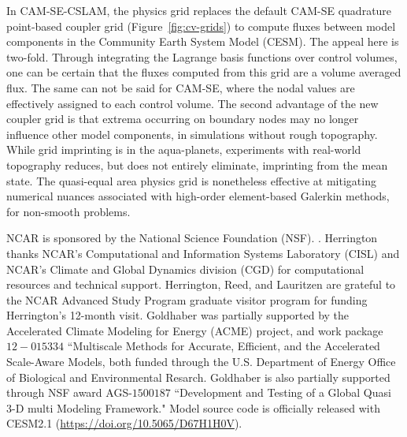 \documentclass[twocol]{ametsoc}
\begin{document}
In CAM-SE-CSLAM, the physics grid replaces the default CAM-SE quadrature point-based coupler grid (Figure~\ref{fig:cv-grids}) to compute fluxes between model components in the Community Earth System Model (CESM). The appeal here is two-fold. Through integrating the Lagrange basis functions over control volumes, one can be certain that the fluxes computed from this grid are a volume averaged flux. The same can not be said for CAM-SE, where the nodal values are effectively assigned to each control volume. The second advantage of the new coupler grid is that extrema occurring on boundary nodes may no longer influence other model components, in simulations without rough topography. While grid imprinting is {\color{red}{effectively eliminated}} in the aqua-planets, experiments with real-world topography {\color{red}{(Held-Suarez and AMIP type configurations)}} reduces, but does not entirely eliminate, imprinting from the mean state. The quasi-equal area physics grid is nonetheless effective at mitigating numerical nuances associated with high-order element-based Galerkin methods, for non-smooth problems.  

%
\acknowledgments
NCAR is sponsored by the National Science Foundation (NSF). {\color{red}{We thank three anonymous reviewers for their helpful comments that significantly improved the clarity of the manuscript}}. Herrington thanks NCAR's Computational and Information Systems Laboratory (CISL) and NCAR's Climate and Global Dynamics division (CGD) for computational resources and technical support. Herrington, Reed, and Lauritzen are grateful to the NCAR Advanced Study Program graduate visitor program for funding Herrington's 12-month visit. Goldhaber was partially supported by the Accelerated Climate Modeling for Energy (ACME) project, and work package $12-015334$ ``Multiscale Methods for Accurate, Efficient, and the Accelerated Scale-Aware Models, both funded through the U.S. Department of Energy Office of Biological and Environmental Resarch. Goldhaber is also partially supported through NSF award AGS-$1500187$ ``Development and Testing of a Global Quasi 3-D multi Modeling Framework." Model source code is officially released with CESM2.1 (\url{https://doi.org/10.5065/D67H1H0V}).
\end{document}
